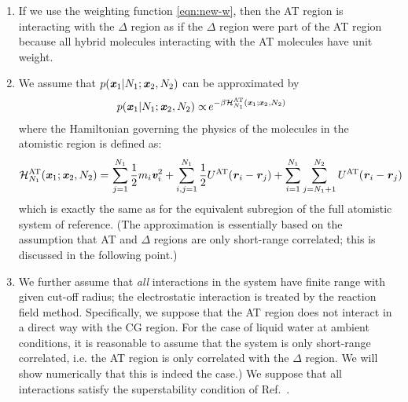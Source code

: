 \documentclass[aip,jcp,a4paper,reprint,onecolumn]{revtex4-1}
\newcommand{\redc}[1]{{\color{red} #1}}
\newcommand{\vect}[1]{\textbf{\textit{#1}}}
\newcommand{\AT}{{\textrm{{AT}}}}
\newcommand{\HY}{{\Delta}}
\begin{document}
\begin{enumerate}

\item If we use the weighting function \eqref{eqn:new-w},
then the AT region is interacting with the $\HY$ region
as if the $\HY$ region were part of the AT region because
all hybrid molecules interacting with the AT molecules have unit weight.

\item We assume that $p(\vect x_1 | N_1; \vect x_2, N_2)$  can be approximated by
\begin{align}\label{eqn:p-1-1}
  p(\vect x_1 | N_1; \vect x_2, N_2)
  \propto &\,
  e^{-\beta\mathcal H_{N_1}^{\AT}(\vect x_1; \vect x_2, N_2)}
\end{align}
\redc{where the Hamiltonian governing the physics of the molecules in the atomistic region is defined as}:
\begin{align}\label{eqn:p-1-2}
  \mathcal H_{N_1}^{{\AT}}(\vect x_1; \vect x_2, N_2) = &\,
  \sum_{j=1}^{N_1}\frac12 m_i\vect v_i^2 + 
  \sum_{i,j=1}^{N_1}\frac12 U^{{\AT}}(\vect r_i - \vect r_j)  +
  \sum_{i=1}^{N_1}\sum_{j=N_1+1}^{N_2} U^{{\AT}}(\vect r_i - \vect r_j)   
\end{align}
which is exactly the same as for the equivalent subregion of the full atomistic system of reference. (The approximation is essentially based on the assumption that AT and $\Delta$ regions are only short-range correlated; this is discussed in the following point.)

\item We further assume that \emph{all} interactions in the system have finite range with given cut-off radius; the
  electrostatic interaction is treated by the reaction field method. Specifically, we suppose that 
  the AT region does not interact in a direct way with the CG region.
  For the case of liquid water at ambient conditions, it is reasonable to assume that the system is only short-range correlated, i.e. the AT region is only correlated with the $\HY$ region. We will show numerically that this is indeed the case.)
  We suppose that all interactions satisfy the superstability condition of Ref.~.
  

\end{enumerate}
\end{document}

